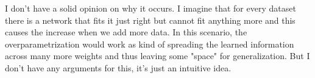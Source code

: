 \documentclass[a4paper,11pt]{article}
\begin{document}
I don't have a solid opinion on why it occurs.
I imagine that for every dataset there is a network that fits it just right but cannot fit anything more and this causes the increase when we add more data.
In this scenario, the overparametrization would work as kind of spreading the learned information across many more weights and thus leaving some "space" for generalization.
But I don't have any arguments for this, it's just an intuitive idea.
\end{document}
